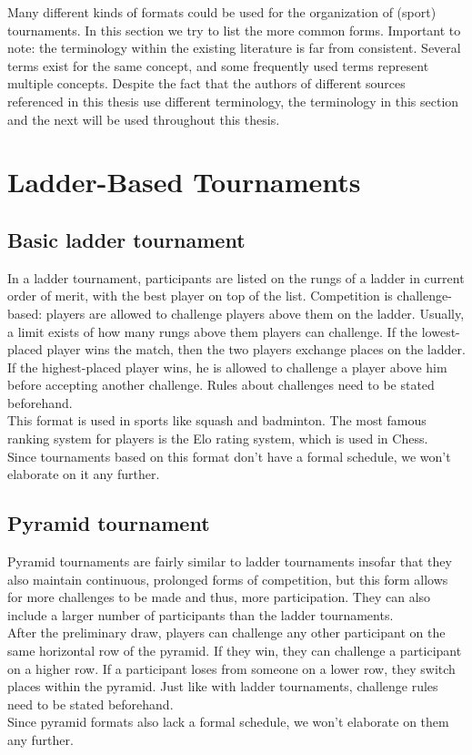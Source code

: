 Many different kinds of formats could be used for the organization of (sport) tournaments. In this section we try to list the more common forms. Important to note: the terminology within the existing literature is far from consistent. Several terms exist for the same concept, and some frequently used terms represent multiple concepts. Despite the fact that the authors of different sources referenced in this thesis use different terminology, the terminology in this section and the next will be used throughout this thesis.

\section{Ladder-Based Tournaments}
\subsection{Basic ladder tournament}
In a ladder tournament, participants are listed on the rungs of a ladder in current order of merit, with the best player on top of the list. Competition is challenge-based: players are allowed to challenge players above them on the ladder. Usually, a limit exists of how many rungs above them players can challenge. If the lowest-placed player wins the match, then the two players exchange places on the ladder. If the highest-placed player wins, he is allowed to challenge a player above him before accepting another challenge. Rules about challenges need to be stated beforehand.
\\[5px]
This format is used in sports like squash and badminton. The most famous ranking system for players is the Elo rating system, which is used in Chess.
\\[5px]
Since tournaments based on this format don’t have a formal schedule, we won’t elaborate on it any further.

\subsection{Pyramid tournament}
Pyramid tournaments are fairly similar to ladder tournaments insofar that they also maintain continuous, prolonged forms of competition, but this form allows for more challenges to be made and thus, more participation. They can also include a larger number of participants than the ladder tournaments.
\\[5px]
After the preliminary draw, players can challenge any other participant on the same horizontal row of the pyramid. If they win, they can challenge a participant on a higher row. If a participant loses from someone on a lower row, they switch places within the pyramid. Just like with ladder tournaments, challenge rules need to be stated beforehand.
\\[5px]
Since pyramid formats also lack a formal schedule, we won’t elaborate on them any further.


